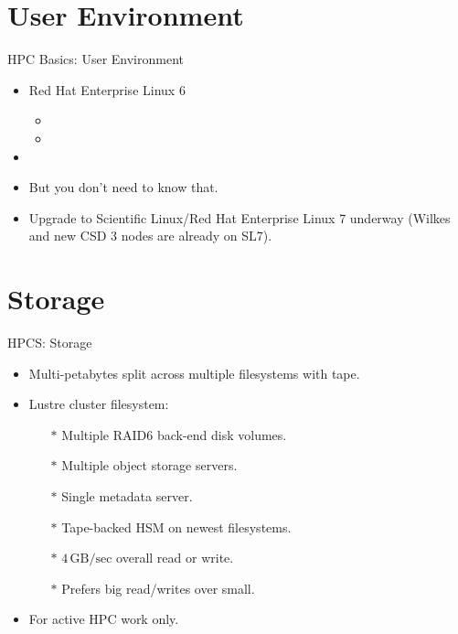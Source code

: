 \section{User Environment}
\begin{frame}{HPC Basics: User Environment}
\begin{itemize}
\item<1,4>{\alert<1>{{Red Hat Enterprise Linux 6}}}
\begin{itemize}
\item{}
\item{}
\end{itemize}
\item<1,4>{}
\item<2->{But you don't need to know that. }
\item<5->{Upgrade to Scientific Linux/Red Hat Enterprise Linux 7 underway (Wilkes and new CSD 3 nodes are already on SL7).}
\end{itemize}
\end{frame}

\section{Storage}
\begin{frame}{HPCS: Storage}
\begin{itemize}
\item{Multi-petabytes split across multiple filesystems with tape.}
\item{Lustre cluster filesystem:}
\begin{itemize}
\item[$\ast$]{Multiple RAID6 back-end disk volumes.}
\item[$\ast$]{Multiple object storage servers.}
\item[$\ast$]{Single metadata server.}
\item[$\ast$]{Tape-backed HSM on newest filesystems.}
\pause
\item[$\ast$]{\alert{$4\,\text{GB/sec}$ overall read or write.}}
\pause
\item[$\ast$]{\alert{Prefers big read/writes over small.}}
\end{itemize}
\pause
\item{\alert{For active HPC work only.}}
\end{itemize}
\end{frame}

